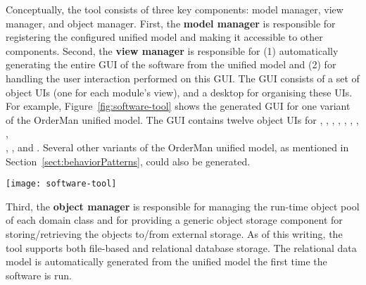 Conceptually, the tool consists of three key components: model manager, view manager, and object manager. First, the \textbf{model manager} is responsible for registering the configured unified model and making it accessible to other components. 
Second, the \textbf{view manager} is responsible for (1) automatically generating the entire GUI of the software from the unified model and (2) for handling the user interaction performed on this GUI. The GUI consists of a set of object UIs (one for each module's view), and a desktop for organising these UIs. For example, Figure~\ref{fig:software-tool} shows the generated GUI for one variant of the OrderMan unified model. The GUI contains twelve object UIs for , ,  , , , , , ,\\ , ,  and .
Several other variants of the OrderMan unified model, as mentioned in Section~\ref{sect:behaviorPatterns}, could also be generated. 
\begin{figure*}[ht]
	\centering
	\texttt{[image: software-tool]}
	\caption{The GUI of OrderMan~software generated by the tool: (1) desktop, 
		(2) the object UIs of  and (3) the .} %
	\label{fig:software-tool}
\end{figure*}
Third, the \textbf{object manager} is responsible for managing the run-time object pool of each domain class and for providing a generic object storage component for storing/retrieving the objects to/from external storage. As of this writing, the tool supports both file-based and relational database storage. The relational data model is automatically generated from the unified model the first time the software is run.